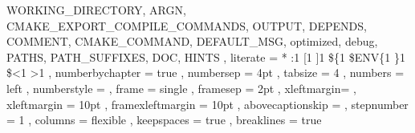 {{						WORKING_DIRECTORY, ARGN, CMAKE_EXPORT_COMPILE_COMMANDS, OUTPUT, DEPENDS, COMMENT, CMAKE_COMMAND,
						DEFAULT_MSG, optimized, debug, PATHS, PATH_SUFFIXES, DOC, HINTS }
,	literate         = *
			{:}{{\lst@ifdisplaystyle\color{msvc_operators}\fi{:}}}{1}
			{[}{{\lst@ifdisplaystyle\color{msvc_operators}\fi{[}}}{1}
            {]}{{\lst@ifdisplaystyle\color{msvc_operators}\fi{]}}}{1}
            {\$\{}{{\lst@ifdisplaystyle\color{msvc_string}\fi{\$\{}}}{1}
            {\$ENV\{}{{\lst@ifdisplaystyle\color{msvc_string}}}{1}
            {\}}{{\lst@ifdisplaystyle\color{msvc_string}\fi{\}}}}{1}
            {\$<}{{\lst@ifdisplaystyle\color{msvc_string}\fi{\$<}}}{1}
            {>}{{\lst@ifdisplaystyle\color{msvc_string}\fi{>}}}{1}
,   numberbychapter  = true
,   numbersep        =  4pt
,   tabsize          =  4
,   numbers          = left
,   numberstyle      = \tiny\color{msvc_linenumber}\noncopynumber
,   frame            = single
,   framesep         =  2pt
,   xleftmargin=\parindent
,   xleftmargin      = 10pt
,   framexleftmargin = 10pt
,   abovecaptionskip = \medskipamount
,   stepnumber       = 1
,   columns          = flexible
,   keepspaces       = true
,   breaklines       = true
}
